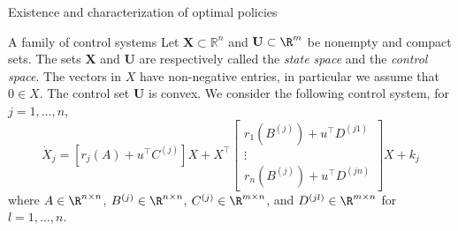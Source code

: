 \begin{frame}{Existence and characterization of optimal policies}
\end{frame}
%
%
%
\begin{frame}{A family of control systems}
    Let $\mathbf{X} \subset \mathbb{R} ^ n$ and 
    $\mathbf{U} \subset \R^m$ be nonempty 
    and compact sets. The sets $\mathbf{X}$ and $\mathbf{U}$ are 
    respectively called the {\it state space} and the {\it control space}. The 
    vectors in $X$ have non-negative entries, in particular we assume that 
    $0\in X$. The control set $\mathbf{U}$ is convex. We consider the following 
    control system, for $j=1,\ldots,n$, 
    \begin{equation*}
        \dot{X}_j  =  [r_j(A) + u^\top C^{(j)}]X +
        X^\top    \begin{bmatrix}
        r_1(B^{(j)}) + u^\top D^{(j1)}\\
        \vdots \\
        r_n(B^{(j)}) + u^\top D^{(jn)}
      \end{bmatrix}  X + k_j
    \end{equation*}
    where $A\in\R^{n\times n}$,
    $B^{(j)}\in\R^{n\times n}$, 
    $C^{(j)}\in\R^{m\times n}$,
    and $ D^{(jl)}\in\R^{m\times n}$ for $l=1,\ldots,n$.
\end{frame}
